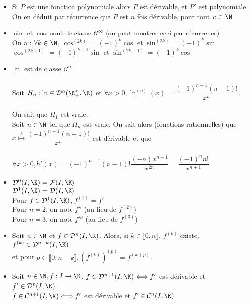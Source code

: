 \documentclass[12pt,a4paper]{report}
\begin{document}
\begin{exemple}
\begin{itemize}
    \item Si $P$ est une fonction polynomiale alors $P$ est dérivable, et $P'$ est polynomiale.\\
    On en déduit par récurrence que $P$ est $n$ fois dérivable, pour tout $n\in \N$
    \item $\sin$ et $\cos$ sont de classe $\mathcal{C}^\infty$ (on peut montrer ceci par récurrence)\\
    On a : $\forall k \in \N$, $\cos^{(2k)} = (-1)^k \cos$ et $\sin^{(2k)} = (-1)^k \sin$\\
    $\cos^{(2k+1)} = (-1)^{k+1} \sin$ et $\sin^{(2k+1)} = (-1)^{k} \cos$
    \item $\ln$ est de classe $\mathcal{C}^\infty$ \\ \\
    Soit $H_n : \ln \in \mathcal{D}^n(\R_+^*,\R)$ et $\forall x > 0, \ln^{(n)}(x) = \dfrac{(-1)^{n-1}(n-1)!}{x^n}$. \\ \\
    On sait que $H_1$ est vraie. \\
    Soit $n \in \N$ tel que $H_n$ est vraie. On sait alors (fonctions rationnelles) que $x \overset{h}{\mapsto} \dfrac{(-1)^{n-1}(n-1)!}{x^n}$ est dérivable et que \\ \\
    $\forall x > 0, h'(x) = (-1)^{n-1}(n-1)! \dfrac{(-n)x^{n-1}}{x^{2n}} = \dfrac{(-1)^n n!}{x^{n+1}}$
\end{itemize}
\end{exemple}

\begin{remarque}
\begin{itemize}
    \item $\mathcal{D}^0(I,\K)=\mathcal{F}(I,\K)$\\
    $\mathcal{D}^1(I,\K)=\mathcal{D}(I,\K)$\\
    Pour $f \in \mathcal{D}^1(I,\K)$, $f^{(1)}=f'$\\
    Pour $n=2$, on note $f''$ (au lieu de $f^{(2)}$)\\
    Pour $n=3$, on note $f'''$ (au lieu de $f^{(3)}$)
    \item Soit $n \in \N$ et $f \in \mathcal{D}^n(I,\K)$. Alors, si $k \in \llbracket 0,n \rrbracket$, $f^{(k)}$ existe, $f^{(k)} \in \mathcal{D}^{n-k}(I,\K)$ \\
    et pour $p \in \llbracket 0,n-k \rrbracket, (f^{(k)})^{(p)} = f^{(k+p)}$.
    \item Soit $n \in \N, f : I \to \K$. $f \in \mathcal{D}^{n+1}(I,\K) \Longleftrightarrow f'$ est dérivable et $f' \in \mathcal{D}^{n}(I,\K)$. \\
    $f \in \mathcal{C}^{n+1}(I,\K) \Longleftrightarrow f'$ est dérivable et $f' \in \mathcal{C}^n(I,\K)$.
\end{itemize}
\end{remarque}
\end{document}
